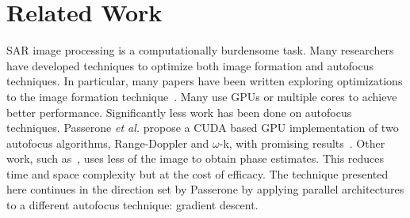 \section{Related Work}\label{sec:relatedwork}

SAR image processing is a computationally burdensome task. Many researchers have
developed techniques to optimize both image formation and autofocus techniques.
In particular, many papers have been written exploring optimizations to the
image formation technique~\cite{yegulalp1999fast, hartley, liu, clemente, fasih, jin,
park2013efficient}. Many use GPUs or multiple cores to achieve better
performance. Significantly less work has been done on autofocus techniques.
Passerone \textit{et al.} propose a CUDA based GPU implementation of two
autofocus algorithms, Range-Doppler and $\omega$-k, with promising
results~\cite{gpu-sar}. Other work, such as~\cite{less_mem_high_eff_autofocus},
uses less of the image to obtain phase estimates. This reduces time and space
complexity but at the cost of efficacy. The technique presented here continues
in the direction set by Passerone by applying parallel architectures to a
different autofocus technique: gradient descent.
